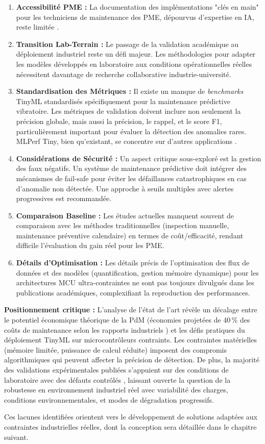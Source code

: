 \begin{enumerate}
\item \textbf{Accessibilité PME :} La documentation des implémentations "clés en main" pour les techniciens de maintenance des PME, dépourvus d'expertise en IA, reste limitée \cite{oecd2021}.

\item \textbf{Transition Lab-Terrain :} Le passage de la validation académique au déploiement industriel reste un défi majeur. Les méthodologies pour adapter les modèles développés en laboratoire aux conditions opérationnelles réelles nécessitent davantage de recherche collaborative industrie-université.

\item \textbf{Standardisation des Métriques :} Il existe un manque de \textit{benchmarks} TinyML standardisés spécifiquement pour la maintenance prédictive vibratoire. Les métriques de validation doivent inclure non seulement la précision globale, mais aussi la précision, le rappel, et le score F1, particulièrement important pour évaluer la détection des anomalies rares. MLPerf Tiny, bien qu'existant, se concentre sur d'autres applications \cite{banbury2021}.

\item \textbf{Considérations de Sécurité :} Un aspect critique sous-exploré est la gestion des faux négatifs. Un système de maintenance prédictive doit intégrer des mécanismes de fail-safe pour éviter les défaillances catastrophiques en cas d'anomalie non détectée. Une approche à seuils multiples avec alertes progressives est recommandée.

\item \textbf{Comparaison Baseline :} Les études actuelles manquent souvent de comparaison avec les méthodes traditionnelles (inspection manuelle, maintenance préventive calendaire) en termes de coût/efficacité, rendant difficile l'évaluation du gain réel pour les PME.

\item \textbf{Détails d'Optimisation :} Les détails précis de l'optimisation des flux de données et des modèles (quantification, gestion mémoire dynamique) pour les architectures MCU ultra-contraintes ne sont pas toujours divulgués dans les publications académiques, complexifiant la reproduction des performances.
\end{enumerate}

\textbf{Positionnement critique :} L'analyse de l'état de l'art révèle un décalage entre le potentiel économique théorique de la PdM (économies projetées de 40\,\% des coûts de maintenance selon les rapports industriels \cite{siemens2024}) et les défis pratiques du déploiement TinyML sur microcontrôleurs contraints. Les contraintes matérielles (mémoire limitée, puissance de calcul réduite) imposent des compromis algorithmiques qui peuvent affecter la précision de détection. De plus, la majorité des validations expérimentales publiées s'appuient sur des conditions de laboratoire avec des défauts contrôlés \cite{antonini2023,arciniegas2025,langer2025}, laissant ouverte la question de la robustesse en environnement industriel réel avec variabilité des charges, conditions environnementales, et modes de dégradation progressifs.

Ces lacunes identifiées orientent vers le développement de solutions adaptées aux contraintes industrielles réelles, dont la conception sera détaillée dans le chapitre suivant.